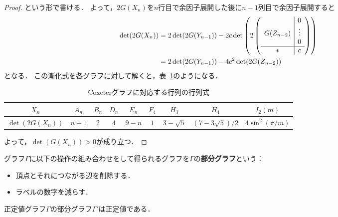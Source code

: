 \begin{proof}
  という形で書ける．
  よって，$2G(X_n)$を$n$行目で余因子展開した後に$n-1$列目で余因子展開すると
  \begin{align}
    \det(2G(X_n))
    &= 2 \det(2G(Y_{n-1})) - 2c \det \left( 2 \left(
      \begin{array}{ccc|c}
        & & &0 \\
        \multicolumn{3}{c|}{G(Z_{n-2})}& \vdots \\
        & & & 0 \\ \hline
        \multicolumn{3}{c|}{*}& c
      \end{array}
    \right) \right)\\
    &= 2 \det(2G(Y_{n-1})) - 4c^2 \det(2G(Z_{n-2}))
  \end{align}
  となる．
  この漸化式を各グラフに対して解くと，表~\ref{table:Coxeter_graph_determinant}のようになる．
  \begin{table}[htbp]
    \centering
    \caption{Coxeterグラフに対応する行列の行列式}
    \label{table:Coxeter_graph_determinant}
    \begin{tabular}{c|cccccccc}
      $X_n$ & $A_n$ & $B_n$ & $D_n$ & $E_n$ & $F_4$ & $H_3$ & $H_4$ & $I_2(m)$ \\ \hline
      $\det(2G(X_n))$ & $n+1$ & $2$ & $4$ & $9-n$ & $1$ & $3-\sqrt{5}$ & $(7-3\sqrt{5})/2$ & $4\sin^2(\pi/m)$
    \end{tabular}
  \end{table}
  よって，$\det (G(X_n)) > 0$が成り立つ．
\end{proof}

\begin{definition}
  グラフ$\Gamma$に以下の操作の組み合わせをして得られるグラフを$\Gamma$の\textbf{部分グラフ}という：
  \begin{itemize}
    \item 頂点とそれにつながる辺を削除する．
    \item ラベルの数字を減らす．
  \end{itemize}
\end{definition}

\begin{lemma}
  正定値グラフ$\Gamma$の部分グラフ$\Gamma'$は正定値である．
\end{lemma}

